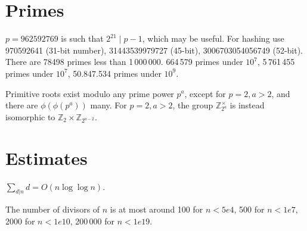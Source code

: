 \section{Primes}
$p=962592769$ is such that $2^{21} \mid p-1$, which may be useful. For hashing
use 970592641 (31-bit number), 31443539979727 (45-bit), 3006703054056749
(52-bit). There are 78498 primes less than 1\,000\,000. 664\,579 primes under $10^{7}$, 
5\,761\,455 primes under $10^{7}$, 50.847.534 primes under $10^{9}$.

Primitive roots exist modulo any prime power $p^a$, except for $p = 2, a > 2$, and there are $\phi(\phi(p^a))$ many.
For $p = 2, a > 2$, the group $\mathbb Z_{2^a}^\times$ is instead isomorphic to $\mathbb Z_2 \times \mathbb Z_{2^{a-2}}$.

\section{Estimates}
$\sum_{d|n} d = O(n \log \log n)$.

The number of divisors of $n$ is at most around 100 for $n < 5e4$, 500 for $n < 1e7$, 2000 for $n < 1e10$, 200\,000 for $n < 1e19$.
